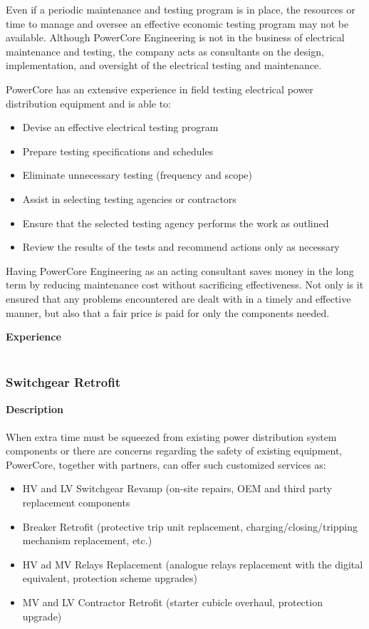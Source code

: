 Even if a periodic maintenance and testing program is in place, the resources or time to manage and oversee an effective economic testing program may not be available. Although PowerCore Engineering is not in the business of electrical maintenance and testing, the company acts as consultants on the design, implementation, and oversight of the electrical testing and maintenance. 

PowerCore has an extensive experience in field testing electrical power distribution equipment and is able to: 
\begin{itemize}
	\item Devise an effective electrical testing program
	\item Prepare testing specifications and schedules
	\item Eliminate unnecessary testing (frequency and scope)
	\item Assist in selecting testing agencies or contractors
	\item Ensure that the selected testing agency performs the work as outlined
	\item Review the results of the tests and recommend actions only as necessary
\end{itemize}

Having PowerCore Engineering as an acting consultant saves money in the long term by reducing maintenance cost without sacrificing effectiveness. Not only is it ensured that any problems encountered are dealt with in a timely and effective manner, but also that a fair price is paid for only the components needed.

\textbf{Experience}\\
\\	

\subsubsection{Switchgear Retrofit }
\label{Sub:Exp:SR}

\textbf{Description}\\
\\
When extra time must be squeezed from existing power distribution system components or there are concerns regarding the safety of existing equipment, PowerCore, together with partners, can offer such customized services as: 
\begin{itemize}
	\item HV and LV Switchgear Revamp (on-site repairs, OEM and third party replacement components
	\item Breaker Retrofit (protective trip unit replacement, charging/closing/tripping mechanism replacement, etc.)
	\item HV ad MV Relays Replacement (analogue relays replacement with the digital equivalent, protection scheme upgrades)
	\item MV and LV Contractor Retrofit (starter cubicle overhaul, protection upgrade)

\end{itemize}

